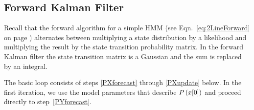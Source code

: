 \subsection{Forward Kalman Filter}
\label{sec:DetailForward}

Recall that the forward algorithm for a simple HMM (see
Eqn.~\eqref{eq:2LineForward} on page \pageref{eq:2LineForward})
alternates between multiplying a state distribution by a likelihood
and multiplying the result by the state transition probability matrix.
In the forward Kalman filter the state transition matrix is a Gaussian
and the sum is replaced by an integral.

The basic loop consists of steps \ref{PXforecast} through
\ref{PXupdate} below.  In the first iteration, we use the model
parameters that describe $P\left({x}{[0]} \right)$ and proceed
directly to step~\ref{PYforecast}.

